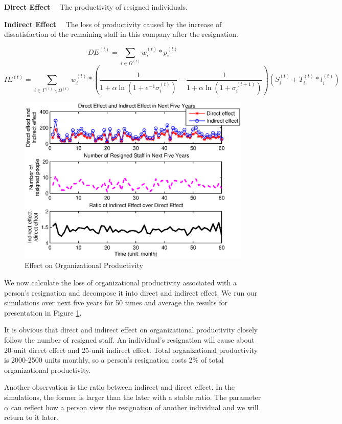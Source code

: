 \documentclass[tcn = 37075, sheet = false, abstract = false]{mcmthesis}
\begin{document}
\noindent \textbf{Direct Effect} \ \ The productivity of resigned individuals.


\noindent \textbf{Indirect Effect} \ \ The loss of productivity caused by the increase of dissatisfaction of the remaining staff in this company after the resignation.

$$DE^{(t)}=\sum\limits_{i\in\Omega^{(t)}}w_i^{(t)}*p_i^{(t)}$$ $$IE^{(t)}=\sum\limits_{i\in\Gamma^{(t)}\backslash\Omega^{(t)}} w_i^{(t)}*(\frac{1}{1+\alpha\ln{(1+e^{-1}\sigma_i^{(t)})}}-\frac{1}{1+\alpha\ln{(1+\sigma_i^{(t+1)})}})(S_i^{(t)}+T_i^{(t)}*t_i^{(t)})$$

\begin{figure}[htb!]
\centering
\includegraphics[width=14cm]{Productivity_figure.eps}
\caption{Effect on Organizational Productivity} 
\label{fig:3}
\end{figure}

We now calculate the loss of organizational productivity associated with a person's resignation and decompose it into direct and indirect effect. We run our simulations over next five years for 50 times and average the results for presentation in Figure \ref{fig:3}.

It is obvious that direct and indirect effect on organizational productivity closely follow the number of resigned staff. An individual's resignation will cause about 20-unit direct effect and 25-unit indirect effect. Total organizational productivity is 2000-2500 units monthly, so a person's resignation costs 2\% of total organizational productivity.

Another observation is the ratio between indirect and direct effect. In the simulations, the former is larger than the later with a stable ratio. The parameter $\alpha$ can reflect how a person view the resignation of another individual and we will return to it later.
\end{document}
